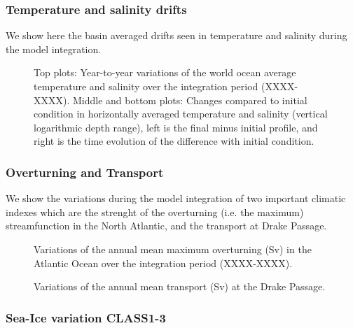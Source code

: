 \subsubsection{Temperature and salinity drifts}

We show here the basin averaged drifts seen in temperature and salinity during the model integration.

\begin{figure}[H]
\begin{center}
\caption{Top plots: Year-to-year variations of the world ocean average temperature and salinity over 
the integration period (XXXX-XXXX). Middle and bottom plots: Changes compared to initial condition in 
horizontally averaged temperature and salinity (vertical logarithmic depth range), left is the 
final minus initial profile, and right is the time evolution of the difference with initial condition.}
\end{center}
\end{figure}

\subsubsection{Overturning and Transport}

We show the variations during the model integration of two important climatic indexes which are the strenght of the overturning (i.e. the maximum) streamfunction in the North Atlantic, and the transport at Drake Passage.

\begin{figure}[H]
\begin{center}
\caption{Variations of the annual mean maximum overturning (Sv) in the Atlantic Ocean over the integration period (XXXX-XXXX).}
\end{center}
\end{figure}

\begin{figure}[H]
\begin{center}
\caption{Variations of the annual mean transport (Sv) at the Drake Passage.}
\end{center}
\end{figure}

\subsubsection{Sea-Ice variation CLASS1-3}

